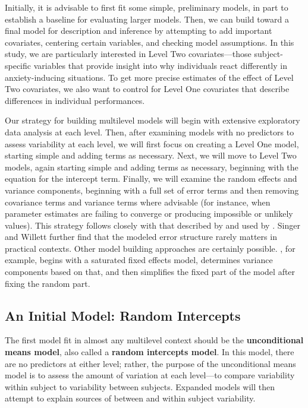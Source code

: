 \documentclass[
]{krantz}
\begin{document}
Initially, it is advisable to first fit some simple, preliminary models, in part to establish a baseline for evaluating larger models. Then, we can build toward a final model for description and inference by attempting to add important covariates, centering certain variables, and checking model assumptions. In this study, we are particularly interested in Level Two covariates---those subject-specific variables that provide insight into why individuals react differently in anxiety-inducing situations. To get more precise estimates of the effect of Level Two covariates, we also want to control for Level One covariates that describe differences in individual performances.

Our strategy for building multilevel models will begin with extensive exploratory data analysis at each level. Then, after examining models with no predictors to assess variability at each level, we will first focus on creating a Level One model, starting simple and adding terms as necessary. Next, we will move to Level Two models, again starting simple and adding terms as necessary, beginning with the equation for the intercept term. Finally, we will examine the random effects and variance components, beginning with a full set of error terms and then removing covariance terms and variance terms where advisable (for instance, when parameter estimates are failing to converge or producing impossible or unlikely values). This strategy follows closely with that described by \citet{Bryk2002} and used by \citet{Singer2003}. Singer and Willett further find that the modeled error structure rarely matters in practical contexts. Other model building approaches are certainly possible. \citet{Diggle2002}, for example, begins with a saturated fixed effects model, determines variance components based on that, and then simplifies the fixed part of the model after fixing the random part.

\hypertarget{modela8}{%
\subsection{An Initial Model: Random Intercepts}\label{modela8}}

The first model fit in almost any multilevel context should be the \textbf{unconditional means model},  also called a \textbf{random intercepts model}.  In this model, there are no predictors at either level; rather, the purpose of the unconditional means model is to assess the amount of variation at each level---to compare variability within subject to variability between subjects. Expanded models will then attempt to explain sources of between and within subject variability.
\end{document}

